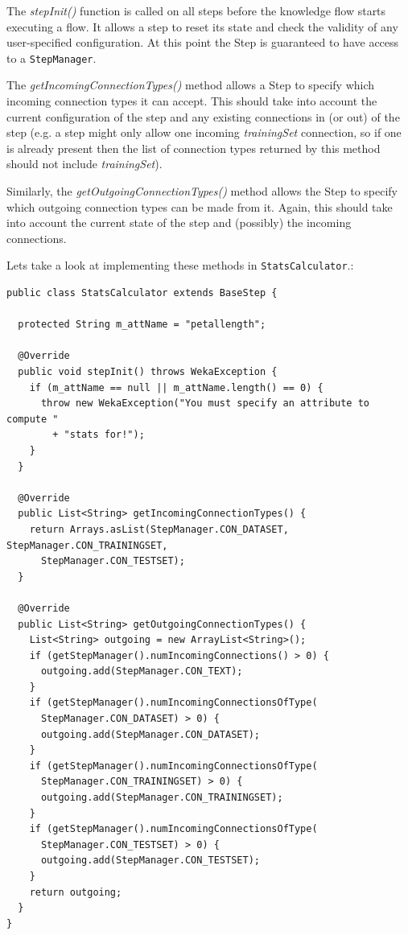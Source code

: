 The \textit{stepInit()} function is called on all steps before the
knowledge flow starts executing a flow. It allows a step to reset its
state and check the validity of any user-specified configuration. At
this point the Step is guaranteed to have access to a
\texttt{StepManager}.

The \textit{getIncomingConnectionTypes()} method allows a Step to
specify which incoming connection types it can accept. This should
take into account the current configuration of the step and any
existing connections in (or out) of the step (e.g. a step might only
allow one incoming \textit{trainingSet} connection, so if one is
already present then the list of connection types returned by this
method should not include \textit{trainingSet}).

Similarly, the \textit{getOutgoingConnectionTypes()} method allows the
Step to specify which outgoing connection types can be made from
it. Again, this should take into account the current state of the step
and (possibly) the incoming connections.

Lets take a look at implementing these methods in
\verb=StatsCalculator=.:

\begin{verbatim}
public class StatsCalculator extends BaseStep {

  protected String m_attName = "petallength";

  @Override
  public void stepInit() throws WekaException {
    if (m_attName == null || m_attName.length() == 0) {
      throw new WekaException("You must specify an attribute to compute "
        + "stats for!");
    }
  }

  @Override
  public List<String> getIncomingConnectionTypes() {
    return Arrays.asList(StepManager.CON_DATASET, StepManager.CON_TRAININGSET,
      StepManager.CON_TESTSET);
  }

  @Override
  public List<String> getOutgoingConnectionTypes() {
    List<String> outgoing = new ArrayList<String>();
    if (getStepManager().numIncomingConnections() > 0) {
      outgoing.add(StepManager.CON_TEXT);
    }
    if (getStepManager().numIncomingConnectionsOfType(
      StepManager.CON_DATASET) > 0) {
      outgoing.add(StepManager.CON_DATASET);
    }
    if (getStepManager().numIncomingConnectionsOfType(
      StepManager.CON_TRAININGSET) > 0) {
      outgoing.add(StepManager.CON_TRAININGSET);
    }
    if (getStepManager().numIncomingConnectionsOfType(
      StepManager.CON_TESTSET) > 0) {
      outgoing.add(StepManager.CON_TESTSET);
    }
    return outgoing;
  }
}
\end{verbatim}

